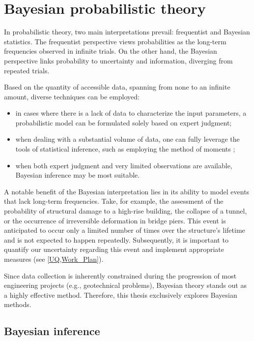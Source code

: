 \chapter{Bayesian probabilistic theory}

\label{ch:Bayesian}
In probabilistic theory, two main interpretations prevail: frequentist and Bayesian statistics. The frequentist perspective views probabilities as the long-term frequencies observed in infinite trials. On the other hand, the Bayesian perspective links probability to uncertainty and information, diverging from repeated trials. 

Based on the quantity of accessible data, spanning from none to an infinite amount, diverse techniques can be employed:

\begin{itemize}[left=0pt]
 \item in cases where there is a lack of data to characterize the input parameters, a probabilistic model can be formulated solely based on expert judgment;
 \item when dealing with a substantial volume of data, one can fully leverage the tools of statistical inference, such as employing the method of moments \citep{wagner2020};
 \item when both expert judgment and very limited observations are available, Bayesian inference may be most suitable.
\end{itemize}

A notable benefit of the Bayesian interpretation lies in its ability to model events that lack long-term frequencies. Take, for example, the assessment of the probability of structural damage to a high-rise building, the collapse of a tunnel, or the occurrence of irreversible deformation in bridge piers. This event is anticipated to occur only a limited number of times over the structure's lifetime and is not expected to happen repeatedly. Subsequently, it is important to quantify our uncertainty regarding this event and implement appropriate measures (see \cref{UQ,Work_Plan}).

Since data collection is inherently constrained during the progression of most engineering projects (e.g., geotechnical problems), Bayesian theory stands out as a highly effective method. Therefore, this thesis exclusively explores Bayesian methods.






\section{Bayesian inference}

